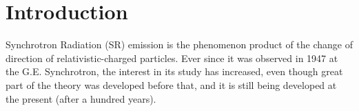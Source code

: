 \documentclass[12pt, letterpaper, twoside, openright]{Thesis} %
\title{\ttitle}
\date{\today}
\title{}
\begin{document}
\frontmatter %

	
\fancyhead{} %
\rhead{\thepage} %
\lhead{} %

\pagestyle{fancy} %
\newcommand{\srthree}{\texttt{Synrad3D}\xspace}
\newcommand{\HRule}{\rule{\linewidth}{0.5mm}} %





\pagestyle{fancy} %

\tableofcontents %

\listoffigures %

\listoftables %







\mainmatter %
\pagestyle{fancy} %


\chapter{Introduction}
\label{sec:org89a9126}
Synchrotron Radiation (SR) emission is the phenomenon product of the change of
direction of relativistic-charged particles.
Ever since it was observed in 1947 at the G.E. Synchrotron, the
interest in its study has increased, even though great part of the theory was
developed before that, and it is still being developed at the present (after a
hundred years). 
\end{document}
